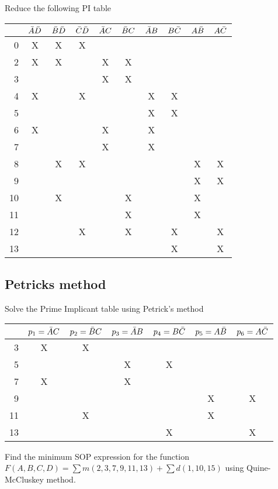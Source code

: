 \begin{example}
  Reduce the following PI table\\
  \begin{tabular}{r|ccccccccc}
    \toprule
    & $\bar{A}\bar{D}$ & $\bar{B}\bar{D}$ & $\bar{C}\bar{D}$ & $\bar{A} C$ & $\bar{B} C$ & $\bar{A} B$ & $B \bar{C}$& $A\bar{B}$ & $A \bar{C}$ \\
    \midrule
     0 & X & X & X &   &   &   &   &   &   \\
     2 & X & X &   & X & X &   &   &   &   \\
     3 &   &   &   & X & X &   &   &   &   \\
     4 & X &   & X &   &   & X & X &   &   \\
     5 &   &   &   &   &   & X & X &   &   \\
     6 & X &   &   & X &   & X &   &   &   \\
     7 &   &   &   & X &   & X &   &   &   \\
     8 &   & X & X &   &   &   &   & X & X \\
     9 &   &   &   &   &   &   &   & X & X \\
    10 &   & X &   &   & X &   &   & X &   \\
    11 &   &   &   &   & X &   &   & X &   \\
    12 &   &   & X &   & X &   & X &   & X \\
    13 &   &   &   &   &   &   & X &   & X \\
    \bottomrule
  \end{tabular}
\end{example}
\vspace{20em}

\subsection{Petricks method}

\begin{example}
  Solve the Prime Implicant table using Petrick's method\\
  \begin{tabular}{r|cccccc}
    \toprule
    & $p_1 = \bar{A} C$ & $p_2 = \bar{B} C$ & $p_3 = \bar{A} B$ & $p_4 = B \bar{C}$& $p_5 = A\bar{B}$ & $p_6 = A \bar{C}$ \\
    \midrule
     3 & X & X &   &   &   &   \\
     5 &   &   & X & X &   &   \\
     7 & X &   & X &   &   &   \\
     9 &   &   &   &   & X & X \\
    11 &   & X &   &   & X &   \\
    13 &   &   &   & X &   & X \\
    \bottomrule
  \end{tabular}
\end{example}
\vspace{20em}


\begin{example}
  Find the minimum SOP expression for the function $F (A, B, C, D) = \sum m(2, 3, 7,
  9, 11, 13) + \sum d(1, 10, 15)$ using Quine-McCluskey method.
\end{example}
